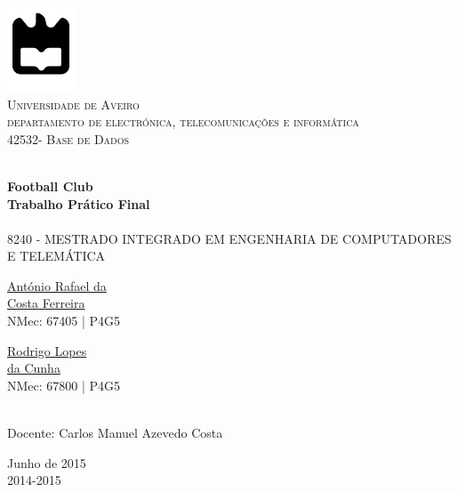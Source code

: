 \begin{titlepage}

\begin{center}

\includegraphics[width=0.15\textwidth]{./logo}\\[0.5cm]    

\textsc{\large Universidade de Aveiro \\[1cm]\large departamento de electrónica, telecomunicações e informática}\\[1cm]

\textsc{\large{42532}\large - Base de Dados \\[1cm]}

\HRule \\[0.5cm]
{ \huge \bfseries Football Club}\\[0.4cm]
{ \large \bfseries Trabalho Prático Final}\\[0.4cm]
\HRule \\[1cm]

\textsc{\small{8240 - MESTRADO INTEGRADO EM ENGENHARIA DE COMPUTADORES E TELEMÁTICA}}\\[1cm]

\begin{minipage}{0.4\textwidth}

\begin{flushleft} \large
\href{mailto:rafael.ferreira@ua.pt}{António Rafael da \\ Costa Ferreira }
 \small{\\NMec: 67405 | P4G5}
\end{flushleft}
\end{minipage}
\begin{minipage}{0.4\textwidth}

\begin{flushright} \large
\href{mailto:rodrigocunha@ua.pt}{Rodrigo Lopes \\ da Cunha}
\small{\\NMec: 67800 | P4G5}
\end{flushright}
\end{minipage}\\[1cm]

{\large Docente: Carlos Manuel Azevedo Costa   }\\[0.5cm]

\vfill

{\large Junho de 2015 \\ 2014-2015}

\end{center}

\end{titlepage}
